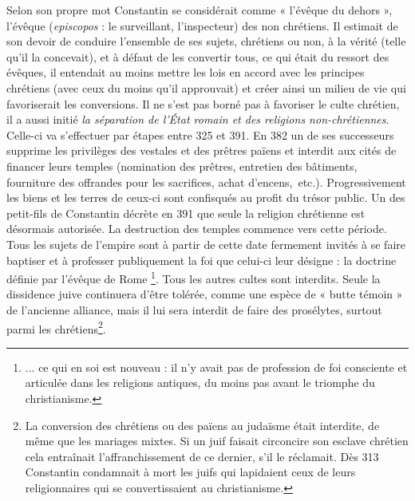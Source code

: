 Selon son propre mot Constantin se considérait comme « l'évêque du dehors », l'évêque (\emph{episcopos} : le surveillant, l'inspecteur) des non chrétiens. Il estimait de son devoir de conduire l'ensemble de ses sujets, chrétiens ou non, à la vérité (telle qu'il la concevait), et à défaut de les convertir tous, ce qui était du ressort des évêques, il entendait au moins mettre les lois en accord avec les principes chrétiens (avec ceux du moins qu'il approuvait) et créer ainsi un milieu de vie qui favoriserait les conversions. Il ne s'est pas borné pas à favoriser le culte chrétien, il a aussi initié \emph{la séparation de l'État romain et des religions non-chrétiennes}. Celle-ci va s'effectuer par étapes entre 325 et 391. En 382 un de ses successeurs supprime les privilèges des vestales et des prêtres païens et interdit aux cités de financer leurs temples (nomination des prêtres, entretien des bâtiments, fourniture des offrandes pour les sacrifices, achat d'encens,~etc.). Progressivement les biens et les terres de ceux-ci sont confisqués au profit du trésor public. Un des petit-fils de Constantin décrète en 391 que seule la religion chrétienne est désormais autorisée. La destruction des temples commence vers cette période. Tous les sujets de l'empire sont à partir de cette date fermement invités à se faire baptiser et à professer publiquement la foi que celui-ci leur désigne : la doctrine définie par l'évêque de Rome \footnote{... ce qui en soi est nouveau : il n'y avait pas de profession de foi consciente et articulée dans les religions antiques, du moins pas avant le triomphe du christianisme.}. Tous les autres cultes sont interdits. Seule la dissidence juive continuera d'être tolérée, comme une espèce de « butte témoin » de l'ancienne alliance, mais il lui sera interdit de faire des prosélytes, surtout parmi les chrétiens\footnote{La conversion des chrétiens ou des païens au judaïsme était interdite, de même que les mariages mixtes. Si un juif faisait circoncire son esclave chrétien cela entraînait  l'affranchissement de ce dernier, s'il le réclamait. Dès 313 Constantin condamnait à mort les juifs qui lapidaient ceux de leurs religionnaires qui se convertissaient au christianisme.}. 

